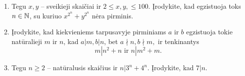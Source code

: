 \begin{enumerate}
  \item \text{[Russia 2009]} Tegu $x,y$ -- sveikieji skaičiai ir $2 \leq x,y,
    \leq 100$. Įrodykite, kad egzistuoja toks $n\in \mathbb N$, su kuriuo $x^{2^n}
    + y^{2^n}$ nėra pirminis. 
  \item \text{[INAMO 2009]} Įrodykite, kad kiekvieniems tarpusavyje
    pirminiams $a$ ir $b$ egzistuoja tokie natūralieji $m$ ir $n$, kad
    $a|m, b|n$, bet $a \nmid n, b \nmid m,$ ir tenkinantys 
    $$m|n^2 + n \text{ ir } n|m^2 + m.$$
  \item {} Tegu $n\geq 2$ -- natūralusis skaičius ir
    $n|3^n + 4^n$. Įrodykite, kad $7|n$.

\end{enumerate}
